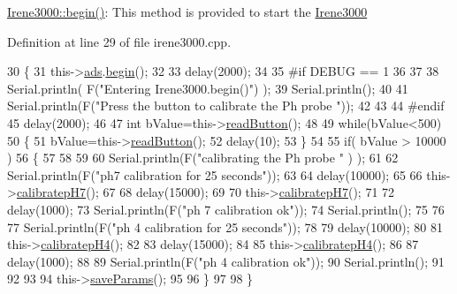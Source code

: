 \hyperlink{class_irene3000_ad5891806c500ae1007afe52b9e304c2b}{Irene3000\+::begin()}\+: This method is provided to start the \hyperlink{class_irene3000}{Irene3000} 

Definition at line 29 of file irene3000.\+cpp.


\begin{DoxyCode}
30 \{
31     this->\hyperlink{class_irene3000_a1215e77ba761c9908d80d691f149e135}{ads}.\hyperlink{class_adafruit___a_d_s1015_a6eba7c3cd854927f60883bb371e5faa6}{begin}();
32 
33     delay(2000);
34 
35 \textcolor{preprocessor}{#if DEBUG == 1 }
36 
37 
38     Serial.println( F(\textcolor{stringliteral}{"Entering Irene3000.begin()"}) );
39     Serial.println();
40     
41     Serial.println(F(\textcolor{stringliteral}{"Press the button to calibrate the Ph probe "}));
42     
43 
44 \textcolor{preprocessor}{#endif}
45     delay(2000);
46 
47     \textcolor{keywordtype}{int} bValue=this->\hyperlink{class_irene3000_a78a87eb7cf295b95c12b2ebd51c2bb77}{readButton}();
48     
49     \textcolor{keywordflow}{while}(bValue<500)
50     \{
51         bValue=this->\hyperlink{class_irene3000_a78a87eb7cf295b95c12b2ebd51c2bb77}{readButton}();
52         delay(10);  
53     \}
54 
55     \textcolor{keywordflow}{if}(  bValue > 10000 )
56     \{
57     
58 
59         
60         Serial.println(F(\textcolor{stringliteral}{"calibrating the Ph probe "} ) );
61         
62         Serial.println(F(\textcolor{stringliteral}{"ph7 calibration for 25 seconds"}));
63         
64         delay(10000);
65         
66         this->\hyperlink{class_irene3000_a1d3299202e4cb7afcff9c9e3e95d94c1}{calibratepH7}();
67 
68         delay(15000);       
69     
70         this->\hyperlink{class_irene3000_a1d3299202e4cb7afcff9c9e3e95d94c1}{calibratepH7}();
71 
72         delay(1000);
73         Serial.println(F(\textcolor{stringliteral}{"ph 7 calibration ok"}));
74         Serial.println();
75     
76 
77         Serial.println(F(\textcolor{stringliteral}{"ph 4 calibration for 25 seconds"}));
78     
79         delay(10000);       
80 
81         this->\hyperlink{class_irene3000_aa140dd026922a04981edfd04d46cabbe}{calibratepH4}();
82 
83         delay(15000);
84         
85         this->\hyperlink{class_irene3000_aa140dd026922a04981edfd04d46cabbe}{calibratepH4}();
86     
87         delay(1000);        
88 
89         Serial.println(F(\textcolor{stringliteral}{"ph 4 calibration ok"}));
90         Serial.println();
91     
92 
93 
94         this->\hyperlink{class_irene3000_a63dbd38e79b8cd5f1fba4b245501a894}{saveParams}();
95     
96     \}
97 
98 \}
\end{DoxyCode}
